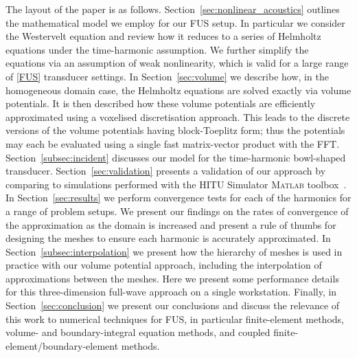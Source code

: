 \documentclass[preprint]{JASA}
\newcommand{\red}[1]{{\color{red} #1}}
\begin{document}
The layout of the paper is as follows. Section~\ref{sec:nonlinear_acoustics}
outlines the mathematical model we employ for our \red{FUS} setup. In particular we 
consider the Westervelt equation and review how it reduces to a series of Helmholtz 
equations under the time-harmonic assumption. We further simplify the equations
via an assumption of weak nonlinearity, which is valid for a large range
of \ref{FUS} transducer settings. In Section~\ref{sec:volume} we 
describe how, in the homogeneous domain case, the Helmholtz equations are solved 
exactly via volume potentials. It is then described how these volume potentials 
are efficiently approximated using a voxelised discretisation 
approach. This leads to the discrete versions of the volume potentials having 
block-Toeplitz form; thus the potentials may each be evaluated using 
a single fast matrix-vector product with the FFT. Section~\ref{subsec:incident} 
discusses our model for the time-harmonic bowl-shaped transducer.
Section~\ref{sec:validation} 
presents a validation of our approach by comparing to simulations performed 
with the HITU Simulator \textsc{Matlab} toolbox~\cite{HITUwebpage,soneson2017extending}.
In Section~\ref{sec:results} we perform convergence tests for each of the 
harmonics for a range of problem setups. We present our findings on the rates 
of convergence of the approximation as the domain is increased and present a rule 
of thumbs for designing the meshes to ensure each harmonic is accurately 
approximated. In Section~\ref{subsec:interpolation} we present how the hierarchy 
of meshes is used in practice with our volume potential approach, including the 
interpolation of approximations between the meshes. Here we present some performance 
details for this three-dimension full-wave approach on a single workstation.
Finally, in Section~\ref{sec:conclusion} we 
present our conclusions and discuss the relevance of this work to numerical 
techniques for \red{FUS}, in particular finite-element methods, volume- and 
boundary-integral equation methods, and coupled finite-element/boundary-element 
methods. 
\end{document}
